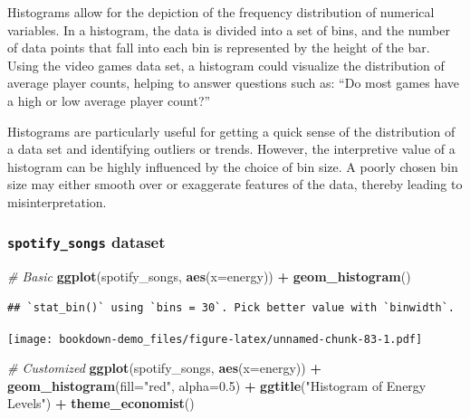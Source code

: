 \documentclass[
  b5paper]{book}
\newenvironment{Shaded}{\begin{snugshade}}{\end{snugshade}}
\newcommand{\AttributeTok}[1]{\textcolor[rgb]{0.13,0.29,0.53}{#1}}
\newcommand{\CommentTok}[1]{\textcolor[rgb]{0.56,0.35,0.01}{\textit{#1}}}
\newcommand{\FloatTok}[1]{\textcolor[rgb]{0.00,0.00,0.81}{#1}}
\newcommand{\FunctionTok}[1]{\textcolor[rgb]{0.13,0.29,0.53}{\textbf{#1}}}
\newcommand{\NormalTok}[1]{#1}
\newcommand{\SpecialCharTok}[1]{\textcolor[rgb]{0.81,0.36,0.00}{\textbf{#1}}}
\newcommand{\StringTok}[1]{\textcolor[rgb]{0.31,0.60,0.02}{#1}}
\begin{document}
Histograms allow for the depiction of the frequency distribution of numerical variables. In a histogram, the data is divided into a set of bins, and the number of data points that fall into each bin is represented by the height of the bar. Using the video games data set, a histogram could visualize the distribution of average player counts, helping to answer questions such as: ``Do most games have a high or low average player count?''

Histograms are particularly useful for getting a quick sense of the distribution of a data set and identifying outliers or trends. However, the interpretive value of a histogram can be highly influenced by the choice of bin size. A poorly chosen bin size may either smooth over or exaggerate features of the data, thereby leading to misinterpretation.

\hypertarget{spotify_songs-dataset-5}{%
\subsubsection*{\texorpdfstring{\texttt{spotify\_songs} dataset}{spotify\_songs dataset}}\label{spotify_songs-dataset-5}}

\begin{Shaded}
\begin{Highlighting}[]
\CommentTok{\# Basic}
\FunctionTok{ggplot}\NormalTok{(spotify\_songs, }\FunctionTok{aes}\NormalTok{(}\AttributeTok{x=}\NormalTok{energy)) }\SpecialCharTok{+} \FunctionTok{geom\_histogram}\NormalTok{()}
\end{Highlighting}
\end{Shaded}

\begin{verbatim}
## `stat_bin()` using `bins = 30`. Pick better value with `binwidth`.
\end{verbatim}

\texttt{[image: bookdown-demo\_files/figure-latex/unnamed-chunk-83-1.pdf]}

\begin{Shaded}
\begin{Highlighting}[]
\CommentTok{\# Customized}
\FunctionTok{ggplot}\NormalTok{(spotify\_songs, }\FunctionTok{aes}\NormalTok{(}\AttributeTok{x=}\NormalTok{energy)) }\SpecialCharTok{+} 
  \FunctionTok{geom\_histogram}\NormalTok{(}\AttributeTok{fill=}\StringTok{"red"}\NormalTok{, }\AttributeTok{alpha=}\FloatTok{0.5}\NormalTok{) }\SpecialCharTok{+}
  \FunctionTok{ggtitle}\NormalTok{(}\StringTok{"Histogram of Energy Levels"}\NormalTok{) }\SpecialCharTok{+}
  \FunctionTok{theme\_economist}\NormalTok{()}
\end{Highlighting}
\end{Shaded}
\end{document}
